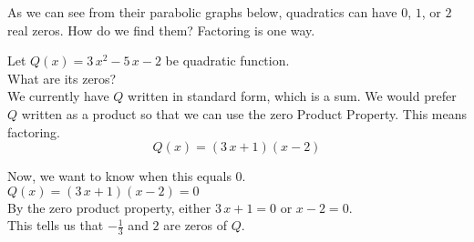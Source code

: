 \documentclass{ximera}
\begin{document}
As we can see from their parabolic graphs below, quadratics can have $0$, $1$, or $2$ real zeros.  How do we find them? Factoring is one way.  







\begin{image}
\end{image}





\begin{example}

Let $Q(x) = 3 \, x^2 - 5 \, x - 2$ be quadratic function. \\

What are its zeros? \\

We currently have $Q$ written in standard form, which is a sum.  We would prefer $Q$ written as a product so that we can use the zero Product Property.  This means factoring. \\


\[
Q(x) = (3 \, x + 1)(x - 2)
\]

Now, we want to know when this equals $0$. \\


$Q(x) = (3 \, x + 1)(x - 2) =0$ \\

By the zero product property, either $3 \, x + 1 = 0$ or $x - 2 = 0$. \\

This tells us that $-\frac{1}{3}$ and $2$ are zeros of $Q$.




\end{example}
\end{document}
